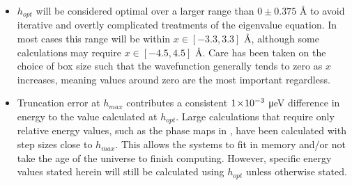 \begin{itemize}
  \item $h_{opt}$ will be considered optimal over a larger range than $0\pm0.375$ Å to avoid iterative and overtly complicated treatments of the eigenvalue equation.
      In most cases this range will be within $x \in [-3.3, 3.3]$ Å, although some calculations may require $x \in [-4.5, 4.5]$ Å.
      Care has been taken on the choice of box size such that the wavefunction generally tends to zero as $x$ increases, meaning values around zero are the most important regardless.
  \item Truncation error at $h_{max}$ contributes a consistent $1\!\times\!10^{-3}$ μeV difference in energy to the value calculated at $h_{opt}$.
      Large calculations that require only relative energy values, such as the phase maps in , have been calculated with step sizes close to $h_{max}$.
      This allows the systems to fit in memory and/or not take the age of the universe to finish computing.
      However, specific energy values stated herein will still be calculated using $h_{opt}$ unless otherwise stated.
\end{itemize}



